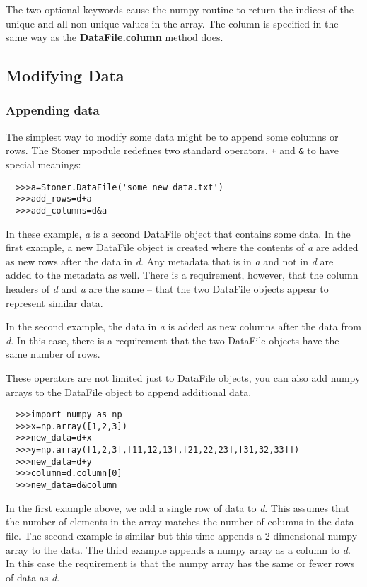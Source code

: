 \documentclass[a4paper,11pt]{scrartcl}
\begin{document}
The two optional keywords cause the numpy routine to return the
indices of the unique and all non-unique values in the array. The
column is specified in the same way as the \textbf{DataFile.column}
method does.

\subsection{Modifying Data}

\subsubsection{Appending data}

The simplest way to modify some data might be to append some columns or rows. The Stoner mpodule redefines two standard operators, \verb:+: and \verb:&: to have special meanings:
\begin{verbatim}
  >>>a=Stoner.DataFile('some_new_data.txt')
  >>>add_rows=d+a
  >>>add_columns=d&a
\end{verbatim}
In these example, \textit{a} is a second DataFile object that contains some data. In the first example, a new DataFile object is created where the contents of \textit{a} are added as new rows after the data in \textit{d}. Any metadata that is in \textit{a} and not in \textit{d} are added to the metadata as well. There is a requirement, however, that the column headers of \textit{d} and \textit{a} are the same -- \ie that the two DataFile objects appear to represent similar data.

In the second example, the data in \textit{a} is added as new columns after the data from \textit{d}. In this case, there is a requirement that the two DataFile objects have the same number of rows.

These operators are not limited just to DataFile objects, you can also add numpy arrays to the DataFile object to append additional data.
\begin{verbatim}
  >>>import numpy as np
  >>>x=np.array([1,2,3])
  >>>new_data=d+x
  >>>y=np.array([1,2,3],[11,12,13],[21,22,23],[31,32,33]])
  >>>new_data=d+y
  >>>column=d.column[0]
  >>>new_data=d&column
\end{verbatim}
In the first example above, we add a single row of data to \textit{d}. This assumes that the number of elements in the array matches the number of columns in the data file. The second example is similar but this time appends a 2 dimensional numpy array to the data. The third example appends a numpy array as a column to \textit{d}. In this case the requirement is that the numpy array has the same or fewer rows of data as \textit{d}.
\end{document}
